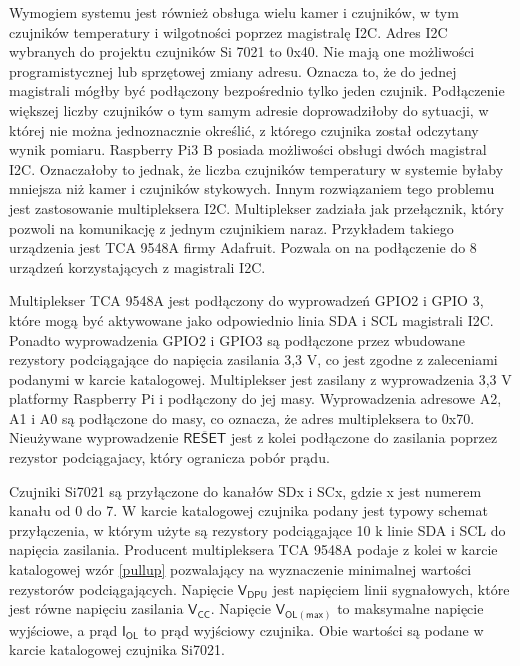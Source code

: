 \documentclass[a4paper,11pt,twoside]{article}
\begin{document}
Wymogiem systemu jest również obsługa wielu kamer i czujników, w tym czujników temperatury i wilgotności poprzez magistralę I2C. Adres I2C wybranych do projektu czujników Si 7021 to 0x40. Nie mają one możliwości programistycznej lub sprzętowej zmiany adresu. Oznacza to, że do jednej magistrali mógłby być podłączony bezpośrednio tylko jeden czujnik. Podłączenie większej liczby czujników o tym samym adresie doprowadziłoby do sytuacji, w której nie można jednoznacznie określić, z którego czujnika został odczytany wynik pomiaru. Raspberry Pi3 B posiada możliwości obsługi dwóch magistral I2C. Oznaczałoby to jednak, że liczba czujników temperatury w systemie byłaby mniejsza niż kamer i czujników stykowych. Innym rozwiązaniem tego problemu jest zastosowanie multipleksera I2C. Multiplekser zadziała jak przełącznik, który pozwoli na komunikację z jednym czujnikiem naraz. Przykładem takiego urządzenia jest TCA 9548A firmy Adafruit. Pozwala on na podłączenie do 8 urządzeń korzystających z magistrali I2C.

Multiplekser TCA 9548A jest podłączony do wyprowadzeń GPIO2 i GPIO 3, które mogą być aktywowane jako odpowiednio linia SDA i SCL magistrali I2C. Ponadto wyprowadzenia GPIO2 i GPIO3 są podłączone przez wbudowane rezystory podciągające do napięcia zasilania 3,3 V\cite{rpi_schematic}, co jest zgodne z zaleceniami podanymi w karcie katalogowej.\cite{multiplekser} Multiplekser jest zasilany z wyprowadzenia 3,3 V platformy Raspberry Pi i podłączony do jej masy. Wyprowadzenia adresowe A2, A1 i A0 są podłączone do masy, co oznacza, że adres multipleksera to 0x70. Nieużywane wyprowadzenie $\overline{\mathsf{RESET}}$ jest z kolei podłączone do zasilania poprzez rezystor podciągajacy, który ogranicza pobór prądu.

Czujniki Si7021 są przyłączone do kanałów SDx i SCx, gdzie x jest numerem kanału od 0 do 7. W karcie katalogowej czujnika podany jest typowy schemat przyłączenia, w którym użyte są rezystory podciągające 10 k\textOmega\hspace{0.2em} linie SDA i SCL do napięcia zasilania. Producent multipleksera TCA 9548A podaje z kolei w karcie katalogowej wzór \ref{pullup} pozwalający na wyznaczenie minimalnej wartości rezystorów podciągających.\cite{multiplekser} Napięcie $\mathsf{V_{DPU}}$ jest napięciem linii sygnałowych, które jest równe napięciu zasilania $\mathsf{V_{CC}}$. Napięcie $\mathsf{V_{OL(max)}}$ to maksymalne napięcie wyjściowe, a prąd $\mathsf{I_{OL}}$ to prąd wyjściowy czujnika. Obie wartości są podane w karcie katalogowej czujnika Si7021.\cite{czujnik_temp}
\end{document}
